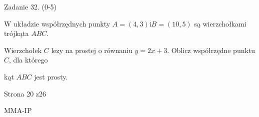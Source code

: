 \documentclass[a4paper,12pt]{article}
\begin{document}
Zadanie 32. (0-5)

$\mathrm{W}$ układzie współrzędnych punkty $A=(4,3) \mathrm{i} B=(10,5)$ są wierzchołkami trójkąta $ABC.$

Wierzchołek $C$ lezy na prostej o równaniu $y=2x+3$. Oblicz współrzędne punktu $C$, dla którego

kąt $ABC$ jest prosty.

Strona 20 z26

MMA-IP
\end{document}
